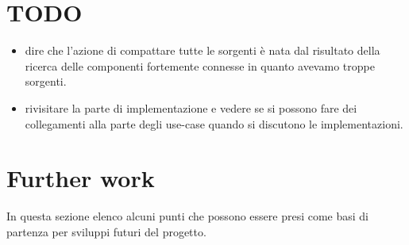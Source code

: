 
\section{TODO}
\begin{itemize}
\item dire che l'azione di compattare tutte le sorgenti \`e nata dal
  risultato della ricerca delle componenti fortemente connesse in
  quanto avevamo troppe sorgenti.
\item rivisitare la parte di implementazione e vedere se si possono
  fare dei collegamenti alla parte degli use-case quando si discutono
  le implementazioni.
\end{itemize}

\section{Further work}

In questa sezione elenco alcuni punti che possono essere presi come
basi di partenza per sviluppi futuri del progetto. 

